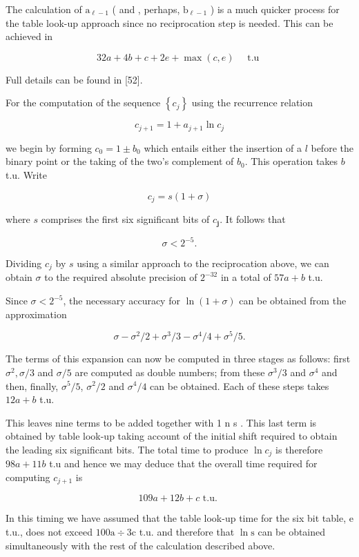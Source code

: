 \documentclass[10pt]{article}
\begin{document}
The calculation of $\mathrm{a}_{\ell-1}$ ( and , perhaps, $\mathrm{b}_{\ell-1}$ ) is a much quicker process for the table look-up approach since no reciprocation step is needed. This can be achieved in

$$
32 a+4 b+c+2 e+\max (c, e) \quad \text { t.u }
$$

Full details can be found in [52].

For the computation of the sequence $\left\{c_{j}\right\}$ using the recurrence relation

$$
c_{j+1}=1+a_{j+1} \ln c_{j}
$$

we begin by forming $c_{0}=1 \pm b_{0}$ which entails either the insertion of a $l$ before the binary point or the taking of the two's complement of $b_{0}$. This operation takes $b$ t.u. Write


\begin{equation*}
c_{j}=s(1+\sigma) \tag{5.5.3}
\end{equation*}


where $s$ comprises the first six significant bits of $c_{\mathbf{j}}$. It follows that

$$
\sigma<2^{-5} .
$$

Dividing $c_{j}$ by $s$ using a similar approach to the reciprocation above, we can obtain $\sigma$ to the required absolute precision of $2^{-32}$ in a total of $57 a+b$ t.u.

Since $\sigma<2^{-5}$, the necessary accuracy for $\ln (1+\sigma)$ can be obtained from the approximation

$$
\sigma-\sigma^{2} / 2+\sigma^{3} / 3-\sigma^{4} / 4+\sigma^{5} / 5 .
$$

The terms of this expansion can now be computed in three stages as follows: first $\sigma^{2}, \sigma / 3$ and $\sigma / 5$ are computed as double numbers; from these $\sigma^{3} / 3$ and $\sigma^{4}$ and then, finally, $\sigma^{5} / 5$, $\sigma^{2} / 2$ and $\sigma^{4} / 4$ can be obtained. Each of these steps takes $12 a+b$ t.u.

This leaves nine terms to be added together with 1 n s . This last term is obtained by table look-up taking account of the initial shift required to obtain the leading six significant bits. The total time to produce $\ln c_{j}$ is therefore $98 a+11 b$ t.u and hence we may deduce that the overall time required for computing $c_{j+1}$ is

$$
109 a+12 b+c \text { t.u. }
$$

In this timing we have assumed that the table look-up time for the six bit table, e t.u., does not exceed $100 \mathrm{a} \div 3 \mathrm{c}$ t.u. and therefore that $\ln \mathrm{s}$ can be obtained simultaneously with the rest of the calculation described above.
\end{document}
